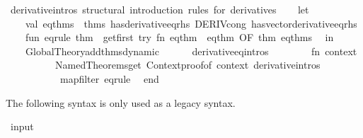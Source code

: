 \begin{isabellebody}
\ derivative{\isacharunderscore}{\kern0pt}intros\ {\isachardoublequoteopen}structural\ introduction\ rules\ for\ derivatives{\isachardoublequoteclose}\isanewline
%
\isadelimML
%
\endisadelimML
%
\isatagML
{}\isamarkupfalse%
\ {\isacartoucheopen}\isanewline
\ \ let\isanewline
\ \ \ \ val\ eq{\isacharunderscore}{\kern0pt}thms\ {\isacharequal}{\kern0pt}\ {\isacharat}{\kern0pt}{\isacharbraceleft}{\kern0pt}thms\ has{\isacharunderscore}{\kern0pt}derivative{\isacharunderscore}{\kern0pt}eq{\isacharunderscore}{\kern0pt}rhs\ DERIV{\isacharunderscore}{\kern0pt}cong\ has{\isacharunderscore}{\kern0pt}vector{\isacharunderscore}{\kern0pt}derivative{\isacharunderscore}{\kern0pt}eq{\isacharunderscore}{\kern0pt}rhs{\isacharbraceright}{\kern0pt}\isanewline
\ \ \ \ fun\ eq{\isacharunderscore}{\kern0pt}rule\ thm\ {\isacharequal}{\kern0pt}\ get{\isacharunderscore}{\kern0pt}first\ {\isacharparenleft}{\kern0pt}try\ {\isacharparenleft}{\kern0pt}fn\ eq{\isacharunderscore}{\kern0pt}thm\ {\isacharequal}{\kern0pt}{\isachargreater}{\kern0pt}\ eq{\isacharunderscore}{\kern0pt}thm\ OF\ {\isacharbrackleft}{\kern0pt}thm{\isacharbrackright}{\kern0pt}{\isacharparenright}{\kern0pt}{\isacharparenright}{\kern0pt}\ eq{\isacharunderscore}{\kern0pt}thms\isanewline
\ \ in\isanewline
\ \ \ \ Global{\isacharunderscore}{\kern0pt}Theory{\isachardot}{\kern0pt}add{\isacharunderscore}{\kern0pt}thms{\isacharunderscore}{\kern0pt}dynamic\isanewline
\ \ \ \ \ \ {\isacharparenleft}{\kern0pt}\isactrlbinding {\isasymopen}derivative{\isacharunderscore}{\kern0pt}eq{\isacharunderscore}{\kern0pt}intros{\isasymclose}{\isacharcomma}{\kern0pt}\isanewline
\ \ \ \ \ \ \ \ fn\ context\ {\isacharequal}{\kern0pt}{\isachargreater}{\kern0pt}\isanewline
\ \ \ \ \ \ \ \ \ \ Named{\isacharunderscore}{\kern0pt}Theorems{\isachardot}{\kern0pt}get\ {\isacharparenleft}{\kern0pt}Context{\isachardot}{\kern0pt}proof{\isacharunderscore}{\kern0pt}of\ context{\isacharparenright}{\kern0pt}\ \isactrlnamedUNDERSCOREtheorems {\isasymopen}derivative{\isacharunderscore}{\kern0pt}intros{\isasymclose}\isanewline
\ \ \ \ \ \ \ \ \ \ {\isacharbar}{\kern0pt}{\isachargreater}{\kern0pt}\ map{\isacharunderscore}{\kern0pt}filter\ eq{\isacharunderscore}{\kern0pt}rule{\isacharparenright}{\kern0pt}\isanewline
\ \ end\isanewline
{\isacartoucheclose}%
\endisatagML
{\isafoldML}%
%
\isadelimML
%
\endisadelimML
%
\begin{isamarkuptext}%
The following syntax is only used as a legacy syntax.%
\end{isamarkuptext}\isamarkuptrue%
\isamarkupfalse%
\ {\isacharparenleft}{\kern0pt}input{\isacharparenright}{\kern0pt}\isanewline

\end{isabellebody}
